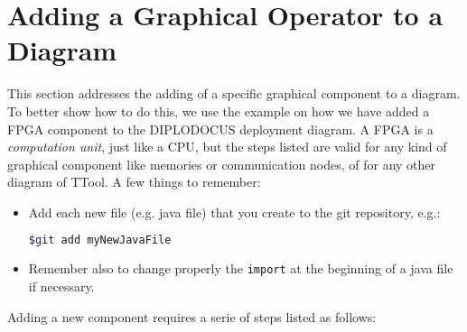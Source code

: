 \documentclass[12pt]{article}
\begin{document}
\section{Adding a Graphical Operator to a Diagram}
This section addresses the adding of a specific graphical component to a diagram. To better show how to do this, we use the example on how we have added a FPGA component to the DIPLODOCUS deployment diagram. A FPGA is a \textit{computation unit}, just like a CPU, but the steps listed are valid for any kind of graphical component like memories or communication nodes, of for any other diagram of TTool. A few things to remember:
\begin{itemize}
\item Add each new file (e.g. java file) that you create to the git repository, e.g.:
\begin{lstlisting}[showspaces=true, language=bash, commentstyle=\color{pgreen},
keywordstyle=\color{pblue}, stringstyle=\color{pred}, basicstyle=\ttfamily]
$git add myNewJavaFile
\end{lstlisting}
\item Remember also to change properly the \texttt{import} at the beginning of a java file if necessary. 
\end{itemize}
Adding a new component requires a serie of steps listed as follows: 
\end{document}
